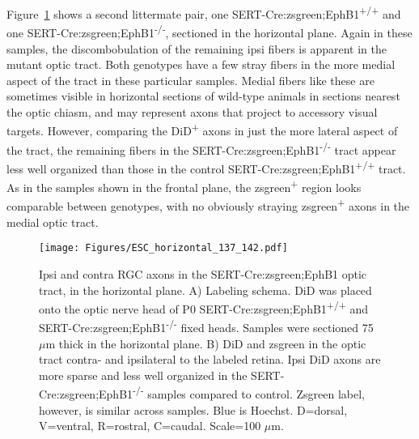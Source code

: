 Figure~\ref{ESChorizontal} shows a second littermate pair, one SERT-Cre:zsgreen;EphB1\textsuperscript{+/+} and one SERT-Cre:zsgreen;EphB1\textsuperscript{-/-}, sectioned in the horizontal plane.
Again in these samples, the discombobulation of the remaining ipsi fibers is apparent in the mutant optic tract.
Both genotypes have a few stray fibers in the more medial aspect of the tract in these particular samples.
Medial fibers like these are sometimes visible in horizontal sections of wild-type animals in sections nearest the optic chiasm, and may represent axons that project to accessory visual targets.
However, comparing the DiD\textsuperscript{+} axons in just the more lateral aspect of the tract, the remaining fibers in the SERT-Cre:zsgreen;EphB1\textsuperscript{-/-} tract appear less well organized than those in the control SERT-Cre:zsgreen;EphB1\textsuperscript{+/+} tract.
As in the samples shown in the frontal plane, the zsgreen\textsuperscript{+} region looks comparable between genotypes, with no obviously straying zsgreen\textsuperscript{+} axons in the medial optic tract.
\begin{figure}[hbtp]
    \begin{center}
        \texttt{[image: Figures/ESC\_horizontal\_137\_142.pdf]}
        \caption[Ipsi and contra RGC axons in the SERT-Cre:zsgreen;EphB1 optic tract, in the horizontal plane.]
        {Ipsi and contra RGC axons in the SERT-Cre:zsgreen;EphB1 optic tract, in the horizontal plane.
        A) Labeling schema.
        DiD was placed onto the optic nerve head of P0 SERT-Cre:zsgreen;EphB1\textsuperscript{+/+} and SERT-Cre:zsgreen;EphB1\textsuperscript{-/-} fixed heads.
        Samples were sectioned 75 $\mu$m thick in the horizontal plane.
        B) DiD and zsgreen in the optic tract contra- and ipsilateral to the labeled retina.
        Ipsi DiD axons are more sparse and less well organized in the SERT-Cre:zsgreen;EphB1\textsuperscript{-/-} samples compared to control.
        Zsgreen label, however, is similar across samples.
        Blue is Hoechst.
        D=dorsal, V=ventral, R=rostral, C=caudal.
        Scale=100 $\mu$m.}
        \label{ESChorizontal}
    \end{center}
\end{figure}

